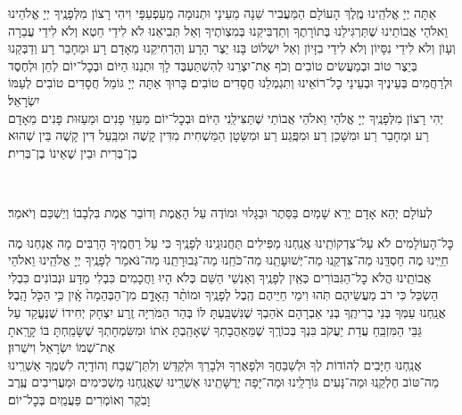 אַתָּה יְיָ אֱלֹהֵֽינוּ מֶֽלֶךְ הָעוֹלָם הַמַּעֲבִיר שֵׁנָה מֵעֵינָי וּתְנוּמָה מֵעַפְעַפָּי \middot וִיהִי רָצוֹן מִלְּפָנֶֽיךָ יְיָ אֱלֹהֵינוּ וֵאלֹהֵי אֲבוֹתֵינוּ שֶׁתַּרְגִּילֵנוּ בְּתוֹרָתֶךָ וְתַדְבִּיקֵנוּ בְּמִצְוׂתֶיךָ וְאַל תְּבִיאֵנוּ לֹא לִידֵי חֵטְא וְלֹא לִידֵי עֲבֵרָה וְעָוׂן וְלֹא לִידֵי נִסָּיוֹן וְלֹא לִידֵי בִזָּיוֹן וְאַל יִשְׁלוֹט בָּנוּ יֵצֶר הָרָע וְהַרְחִיקֵנוּ מֵאָדָם רָע וּמֵחָבֵר רָע וְדַבְּקֵנוּ בְּיֵצֶר טוֹב וּבְמַעֲשִׂים טוֹבִים וְכֹף אֶת־יִצְרֵנוּ לְהִשְׁתַּעְבֶּד לָךְ  \middot וּתְנֵנוּ הַיּוֹם וּבְכׇל־יוֹם לְחֵן וּלְחֶסֶד וּלְרַחֲמִים בְּעֵינֶיךָ וּבְעֵינֵי כׇל־רוֹאֵינוּ וְתִגְמְלֵנוּ חֲסָדִים טוֹבִים׃ בָּרוּךְ אַתָּה יְיָ גּוֹמֵל חֲסָדִים טוֹבִים לְעַמּוֹ יִשְׂרָאֵל׃\\
יְהִי רָצוֹן מִלְּפָנֶֽיךָ יְיָ אֱלֹהַי וֵאלֹהֵי אֲבוֹתַי שֶׁתַּצִּילֵֽנִי הַיּוֹם וּבְכׇל־יוֹם מֵעַזֵּי פָנִים וּמֵעַזּוּת פָּנִים מֵאָדָם רַע וּמֵחָבֵר רַע וּמִשָּׁכֵן רַע וּמִפֶּֽגַע רַע וּמִשָּׂטָן הַמַּשְׁחִית מִדִּין קָשֶׁה וּמִבַּֽעַל דִּין קָשֶׁה בֵּין שְׁהוּא בֶן־בְּרִית וּבֵין שֶׁאֵינוֹ בֶן־בְּרִית׃

\\
\begin{footnotesize}לְעוֹלָם יְהֵא אָדָם יְרֵא שָׁמַיִם בַּסֵּתֶר וּבַגָּלוּי וּמוֹדֶה עַל הָאֱמֶת וְדוֹבֵר אֱמֶת בִּלְבָבוֹ וְיַשְׁכֵּם וְיֹאמַר׃\end{footnotesize}

כׇּל־הָעוֹלָמִים לֹא עַל־צִדְקוֹתֵֽינוּ אֲנַֽחְנוּ מַפִּילִים תַּחֲנוּנֵֽינוּ לְפָנֶֽיךָ כִּי עַל רַחֲמֶֽיךָ הָרַבִּים \middot מָה אֲנַחְנוּ מֶה חַיֵּֽינוּ מֶה חַסְדֵּֽנוּ מַה־צִּדְקֵֽנוּ מַה־יְּשׁוּעָתֵֽנוּ מַה־כֹּחֵֽנוּ מַה־גְּבוּרָתֵֽנוּ \middot מַה־נֹּאמַר לְפָנֶֽיךָ יְיָ אֱלֹהֵֽינוּ וֵאלֹהֵי אֲבוֹתֵֽינוּ הֲלֹא כׇל־הַגִּבּוֹרִים כְּאַֽיִן לְפָנֶֽיךָ וְאַנְשֵׁי הַשֵּׁם כְּלֹא הָיוּ וַחֲכָמִים כִּבְלִי מַדָּע וּנְבוֹנִים כִּבְלִי הַשְׂכֵּל \middot כִּי רֹב מַעֲשֵׂיהֶם תֹּֽהוּ וִימֵי חַיֵּיהֶם הֶֽבֶל לְפָנֶֽיךָ
וּמוֹתַ֨ר הָֽאָדָ֤ם מִן־הַבְּהֵמָה֙ אָֽ֔יִן כִּ֥י הַכֹּ֖ל הָֽבֶל׃ \\
אֲנַֽחְנוּ עַמְּךָ בְּנֵי בְרִיתֶֽךָ בְּנֵי אַבְרָהָם אֹהַבְךָ שֶׁנִּשְׁבַּֽעְתָּ לּוֹ בְּהַר הַמֹּרִיָּה זֶֽרַע יִצְחָק יְחִידוֹ שֶׁנֶּעֱקַד עַל גַּבֵּי הַמִּזְבֵּֽחַ עֲדַת יַעֲקֹב בִּנְךָ בְּכוֹרֶֽךָ שֶׁמֵּאַהֲבָתְךָ שֶׁאָהַֽבְתָּ אֹתוֹ וּמִשִּׂמְחָתְךָ שֶׁשָּׂמַֽחְתָּ בּוֹ קָרָֽאתָ אֶת־שְׁמוֹ יִשְׂרָאֵל וִישֻׁרוּן׃ \\
אֲנַֽחְנוּ חַיָּבִים לְהוֹדוֹת לְךָ וּלְשַׁבֵּחֲךָ וּלְפָאֶרְךָ וּלְבָרֵךְ וּלְקַדֵּשׁ וְלִתֵּן־שֶֽׁבַח וְהוֹדָיָה לִשְׁמֶֽךָ \middot אַשְׁרֵֽינוּ מַה־טּוֹב חֶלְקֵֽנוּ וּמַה־נָּעִים גּוֹרָלֵֽינוּ וּמַה־יָּפָה יְרֻשָּׁתֵֽינוּ \middot אַשְׁרֵֽינוּ שֶׁאֲנַֽחְנוּ מַשְׁכִּימִים וּמַעֲרִיבִים עֶֽרֶב וָבֹֽקֶר וְאוֹמְרִים פַּעֲמַֽיִם בְּכׇל־יוֹם׃

